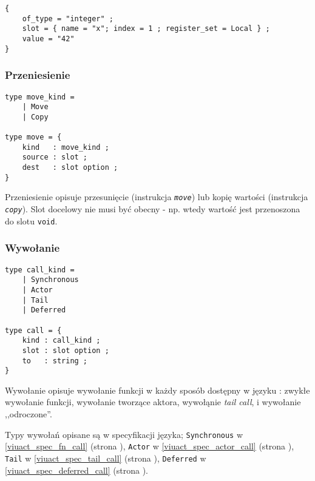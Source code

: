 \begin{small}
\begin{lstlisting}
{
    of_type = "integer" ;
    slot = { name = "x"; index = 1 ; register_set = Local } ;
    value = "42"
}
\end{lstlisting}
\end{small}

\subsubsection{Przeniesienie}
\label{diagram_klas_przeniesienie}

\begin{small}
\begin{lstlisting}
type move_kind =
    | Move
    | Copy

type move = {
    kind   : move_kind ;
    source : slot ;
    dest   : slot option ;
}
\end{lstlisting}
\end{small}

Przeniesienie opisuje przesunięcie (instrukcja \emph{\texttt{move}}) lub kopię wartości (instrukcja
\emph{\texttt{copy}}). Slot docelowy nie musi być obecny - np. wtedy wartość jest przenoszona do slotu
\texttt{void}.

\subsubsection{Wywołanie}
\label{diagram_klas_wywolanie}

\begin{small}
\begin{lstlisting}
type call_kind =
    | Synchronous
    | Actor
    | Tail
    | Deferred

type call = {
    kind : call_kind ;
    slot : slot option ;
    to   : string ;
}
\end{lstlisting}
\end{small}

Wywołanie opisuje wywołanie funkcji w każdy sposób dostępny w języku \ViuAct: zwykłe wywołanie funkcji,
wywołanie tworzące aktora, wywołąnie \emph{tail call}, i wywołanie ,,odroczone''.

Typy wywołań opisane są w specyfikacji języka;
\texttt{Synchronous} w \ref{viuact_spec_fn_call} (strona \pageref{viuact_spec_fn_call}),
\texttt{Actor} w \ref{viuact_spec_actor_call} (strona \pageref{viuact_spec_actor_call}),
\texttt{Tail} w \ref{viuact_spec_tail_call} (strona \pageref{viuact_spec_tail_call}),
\texttt{Deferred} w \ref{viuact_spec_deferred_call} (strona \pageref{viuact_spec_deferred_call}).

